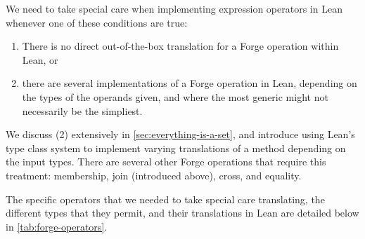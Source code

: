 We need to take special care when implementing expression operators in Lean whenever one of these conditions are true: 
\begin{enumerate}[(1)]
  \item There is no direct out-of-the-box translation for a Forge operation within Lean, or
  \item there are several implementations of a Forge operation in Lean, depending on the types of the operands given, and where the most generic might not necessarily be the simpliest. 
\end{enumerate}
We discuss (2) extensively in \cref{sec:everything-is-a-set}, and introduce using Lean's type class system to implement varying translations of a method depending on the input types. There are several other Forge operations that require this treatment: membership, join (introduced above), cross, and equality. 

The specific operators that we needed to take special care translating, the different types that they permit, and their translations in Lean are detailed below in \cref{tab:forge-operators}. 


